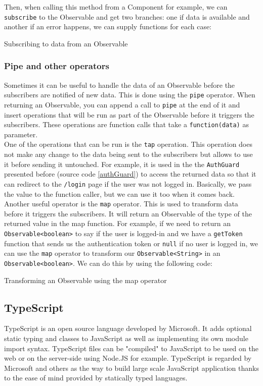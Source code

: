 \documentclass[twoside, openright,11pt,a4paper]{book}
\newenvironment{code}{\captionsetup{type=listing}}{}
\begin{document}
Then, when calling this method from a Component for example, we can \verb+subscribe+ to the Observable and get two branches: one if data is available and another if an error happens, we can supply functions for each case:
\begin{code}
	\caption{Subscribing to data from an Observable}
\end{code}
\subsubsection{Pipe and other operators}
\label{pipe_operators}
Sometimes it can be useful to handle the data of an Observable before the subscribers are notified of new data. This is done using the \verb+pipe+ operator. When returning an Observable, you can append a call to \verb+pipe+ at the end of it and insert operations that will be run as part of the Observable before it triggers the subscribers. These operations are function calls that take a \verb+function(data)+ as parameter. \\

One of the operations that can be run is the \verb+tap+ operation. This operation does not make any change to the data being sent to the subscribers but allows to use it before sending it untouched. For example, it is used in the the \verb+AuthGuard+ presented before (source code \ref{authGuard}) to access the returned data so that it can redirect to the \verb+/login+ page if the user was not logged in. Basically, we pass the value to the function caller, but we can use it too when it comes back.\\

Another useful operator is the \verb+map+ operator. This is used to transform data before it triggers the subscribers. It will return an Observable of the type of the returned value in the map function. For example, if we need to return an \verb+Observable<boolean>+ to say if the user is logged-in and we have a \verb+getToken+ function that sends us the authentication token or \verb+null+ if no user is logged in, we can use the \verb+map+ operator to transform our \verb+Observable<String>+ in an \verb+Observable<boolean>+. We can do this by using the following code:
\begin{code}
	\caption{Transforming an Observable using the map operator}
\end{code}
\subsection{TypeScript}
TypeScript\cite{github:typescript} is an open source language developed by Microsoft. It adds optional static typing and classes to JavaScript as well as implementing its own module import syntax. TypeScript files can be "compiled" to JavaScript to be used on the web or on the server-side using Node.JS for example. TypeScript is regarded by Microsoft and others as the way to build large scale JavaScript application thanks to the ease of mind provided by statically typed languages. \\
\end{document}
